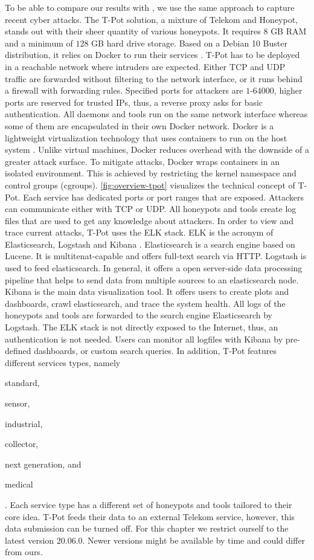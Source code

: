 To be able to compare our results with \citet{Kelly2021}, we use the same approach to capture recent cyber attacks.
The T-Pot solution, a mixture of Telekom and Honeypot, stands out with their sheer quantity of various honeypots.
It requires $8$ GB RAM and a minimum of $128$ GB hard drive storage.
Based on a Debian 10 Buster distribution, it relies on Docker to run their services \cite{docker2021}.
T-Pot has to be deployed in a reachable network where intruders are expected.
Either TCP and UDP traffic are forwarded without filtering to the network interface, or it runs behind a firewall with forwarding rules.
Specified ports for attackers are $1$-$64000$, higher ports are reserved for trusted IPs, thus, a reverse proxy asks for basic authentication.
All daemons and tools run on the same network interface whereas some of them are encapsulated in their own Docker network.
Docker is a lightweight virtualization technology that uses containers to run on the host system \cite{combe2016}.
Unlike virtual machines, Docker reduces overhead with the downside of a greater attack surface.
To mitigate attacks, Docker wraps containers in an isolated environment.
This is achieved by restricting the kernel namespace and control groups (cgroups).
\autoref{fig:overview-tpot} visualizes the technical concept of T-Pot.
Each service has dedicated ports or port ranges that are exposed.
Attackers can communicate either with TCP or UDP.
All honeypots and tools create log files that are used to get any knowledge about attackers.
In order to view and trace current attacks, T-Pot uses the ELK stack.
ELK is the acronym of Elasticsearch, Logstash and Kibana \cite{elastic2021}.
Elasticsearch is a search engine based on Lucene.
It is multitenat-capable and offers full-text search via HTTP.
Logstash is used to feed elasticsearch.
In general, it offers a open server-side data processing pipeline that helps to send data from multiple sources to an elasticsearch node.
Kibana is the main data visualization tool.
It offers users to create plots and dashboards, crawl elasticsearch, and trace the system health.
All logs of the honeypots and tools are forwarded to the search engine Elasticsearch by Logstash.
The ELK stack is not directly exposed to the Internet, thus, an authentication is not needed.
Users can monitor all logfiles with Kibana by pre-defined dashboards, or custom search queries.
In addition, T-Pot features different services types, namely
\begin{enumerate*}[label=(\roman*)]
    \item standard,
    \item sensor,
    \item industrial,
    \item collector,
    \item next generation, and
    \item medical
\end{enumerate*}.
Each service type has a different set of honeypots and tools tailored to their core idea.
T-Pot feeds their data to an external Telekom service, however, this data submission can be turned off.
For this chapter we restrict ourself to the latest version $20.06.0$.
Newer versions might be available by time and could differ from ours.

